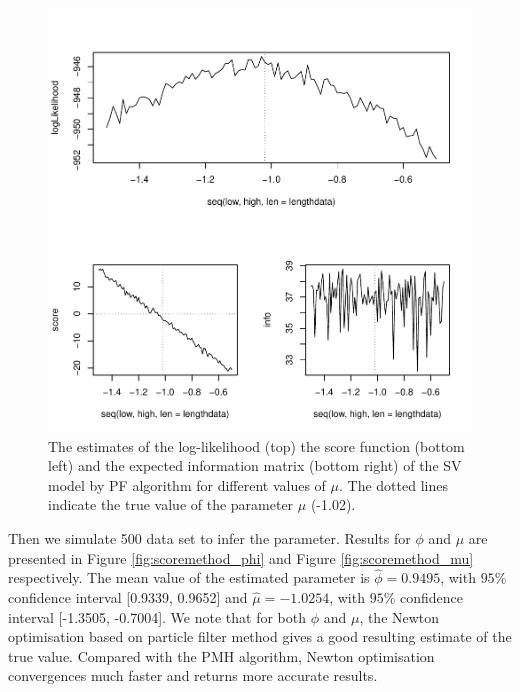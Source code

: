 \documentclass[mstat,12pt]{unswthesis}  %
\numberwithin{equation}{section}
\begin{document}
\begin{figure}[H]
    \centering
    \includegraphics[width=1.0\linewidth]{score_mu.pdf}
    \caption
    {The estimates of the log-likelihood (top) the score
    function (bottom left) and the expected information matrix (bottom right) of the
    SV model by PF algorithm for different values of $\mu$. The dotted lines indicate the true value of the parameter $\mu$ (-1.02).}
    \label{fig:score_mu}
\end{figure}


\noindent Then we simulate 500 data set to infer the parameter.
Results for $\phi$ and $\mu$ are presented in Figure \ref{fig:scoremethod_phi} and Figure \ref{fig:scoremethod_mu} respectively.
The mean value of the estimated parameter is $\widehat{\phi}=0.9495$, with $95\%$ confidence interval [0.9339, 0.9652] and $\widehat{\mu}=-1.0254$, with $95\%$ confidence interval [-1.3505, -0.7004].
We note that for both $\phi$ and $\mu$, the Newton  optimisation based on particle filter method gives a good resulting estimate of the true value. Compared with the PMH algorithm, Newton  optimisation convergences much faster and returns more accurate results.
\end{document}
